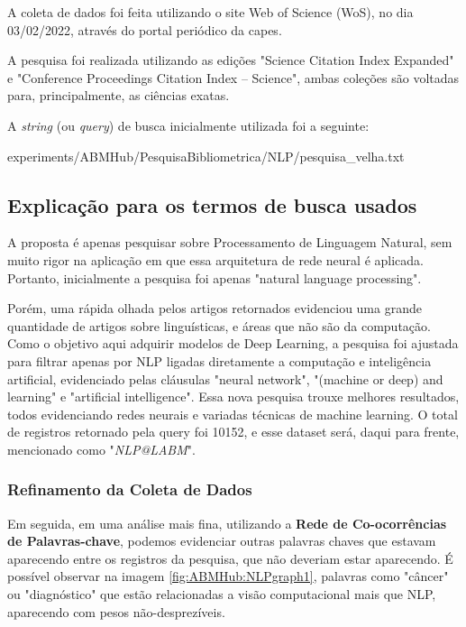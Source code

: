 A coleta de dados foi feita utilizando o site Web of Science (WoS), no dia 03/02/2022, através do portal periódico da capes.

A pesquisa foi realizada utilizando as edições "Science Citation Index Expanded" e "Conference Proceedings Citation Index – Science", ambas coleções são voltadas para, principalmente, as ciências exatas.

A \textit{string} (ou \textit{query}) de busca inicialmente utilizada foi a seguinte:


{experiments/ABMHub/PesquisaBibliometrica/NLP/pesquisa_velha.txt}

\subsection{Explicação para os termos de busca usados}
\label{sec:ABMHub:query}

A proposta é apenas pesquisar sobre Processamento de Linguagem Natural, sem muito rigor na aplicação em que essa arquitetura de rede neural é aplicada. Portanto, inicialmente a pesquisa foi apenas "natural language processing".

Porém, uma rápida olhada pelos artigos retornados evidenciou uma grande quantidade de artigos sobre linguísticas, e áreas que não são da computação. Como o objetivo aqui adquirir modelos de Deep Learning, a pesquisa foi ajustada para filtrar apenas por NLP ligadas diretamente a computação e inteligência artificial, evidenciado pelas cláusulas "neural network", "(machine or deep) and learning" e "artificial intelligence". Essa nova pesquisa trouxe melhores resultados, todos evidenciando redes neurais e variadas técnicas de machine learning. O total de registros retornado pela query foi 10152, e esse dataset será, daqui para frente, mencionado como "\textit{NLP@LABM}".

\subsubsection{Refinamento da Coleta de Dados}
\label{sec:abmhub:refinamento}

 Em seguida, em uma análise mais fina, utilizando a \textbf{Rede de Co-ocorrências de Palavras-chave}, podemos evidenciar outras palavras chaves que estavam aparecendo entre os registros da pesquisa, que não deveriam estar aparecendo. É possível observar na imagem \ref{fig:ABMHub:NLPgraph1}, palavras como "câncer" ou "diagnóstico" que estão relacionadas a visão computacional mais que NLP, aparecendo com pesos não-desprezíveis.
 
